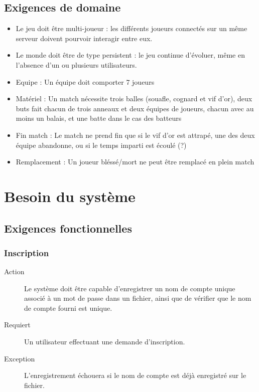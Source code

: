 \documentclass[a4paper]{article}
\begin{document}
\subsection{Exigences de domaine}
\begin{itemize}
\item Le jeu doit être multi-joueur : les différents joueurs connectés sur un même serveur doivent pourvoir interagir entre eux.
\item Le monde doit être de type persistent : le jeu continue d'évoluer, même en l'absence d'un ou plusieurs utilisateurs.
\item Equipe : Un équipe doit comporter 7 joueurs %
\item Matériel : Un match nécessite trois balles (souafle, cognard et vif d'or), deux buts fait chacun de trois anneaux et deux équipes de joueurs, chacun avec au moins un balais, et une batte dans le cas des batteurs %
\item Fin match : Le match ne prend fin que si le vif d'or est attrapé, une des deux équipe abandonne, ou si le temps imparti est écoulé (?)
\item Remplacement : Un joueur bléssé/mort ne peut être remplacé en plein match 
\end{itemize}


\section{Besoin du système}
\subsection{Exigences fonctionnelles}

\subsubsection{Inscription}
\begin{description}
\item[Action] Le système doit être capable d'enregistrer un nom de compte unique associé à un mot de passe dans un fichier, ainsi que de vérifier que le nom de compte fourni est unique.
\item[Requiert] Un utilisateur effectuant une demande d'inscription.
\item[Exception] L'enregistrement échouera si le nom de compte est déjà enregistré sur le fichier.
\end{description}
\end{document}
